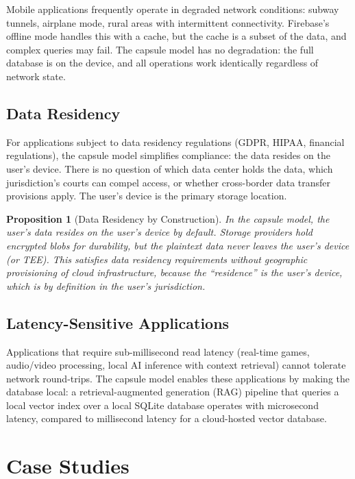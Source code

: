 \documentclass[11pt,a4paper]{article}
\newtheorem{proposition}[theorem]{Proposition}
\begin{document}
Mobile applications frequently operate in degraded network conditions:
subway tunnels, airplane mode, rural areas with intermittent connectivity.
Firebase's offline mode handles this with a cache, but the cache is a
subset of the data, and complex queries may fail. The capsule model has
no degradation: the full database is on the device, and all operations
work identically regardless of network state.

\subsection{Data Residency}

For applications subject to data residency regulations (GDPR, HIPAA,
financial regulations), the capsule model simplifies compliance: the
data resides on the user's device. There is no question of which data
center holds the data, which jurisdiction's courts can compel access,
or whether cross-border data transfer provisions apply. The user's
device is the primary storage location.

\begin{proposition}[Data Residency by Construction]
In the capsule model, the user's data resides on the user's device by
default. Storage providers hold encrypted blobs for durability, but
the plaintext data never leaves the user's device (or TEE). This
satisfies data residency requirements without geographic provisioning
of cloud infrastructure, because the ``residence'' is the user's
device, which is by definition in the user's jurisdiction.
\end{proposition}

\subsection{Latency-Sensitive Applications}

Applications that require sub-millisecond read latency (real-time games,
audio/video processing, local AI inference with context retrieval) cannot
tolerate network round-trips. The capsule model enables these applications
by making the database local: a retrieval-augmented generation (RAG)
pipeline that queries a local vector index over a local SQLite database
operates with microsecond latency, compared to millisecond latency for
a cloud-hosted vector database.

\section{Case Studies}\label{sec:cases}
\end{document}
